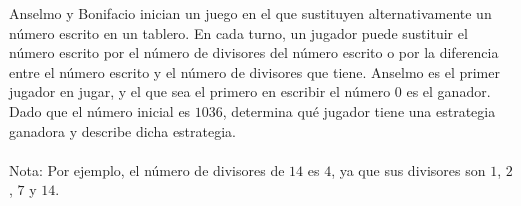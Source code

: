 Anselmo y Bonifacio inician un juego en el que sustituyen alternativamente un número escrito en un tablero. En cada turno, un jugador puede sustituir el número escrito por el número de divisores del número escrito o por la diferencia entre el número escrito y el número de divisores que tiene. Anselmo es el primer jugador en jugar, y el que sea el primero en escribir el número $0$ es el ganador. Dado que el número inicial es $1036$, determina qué jugador tiene una estrategia ganadora y describe dicha estrategia. \\\\
Nota: Por ejemplo, el número de divisores de $14$ es $4$, ya que sus divisores son $1$, $2$, $7$ y $14$.

